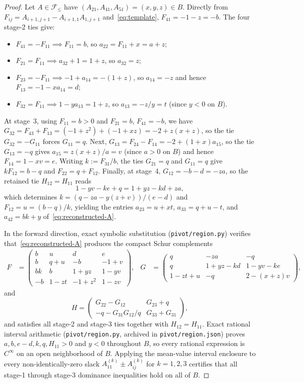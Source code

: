 \documentclass[11pt]{article}
\theoremstyle{remark}
\begin{document}
\begin{proof}
Let $A\in\mathcal{F}_{\le}$ have $(A_{21},A_{41},A_{51})=(x,y,z)\in B$.
Directly from $F_{ij}=A_{i+1,j+1}-A_{i+1,1}A_{1,j+1}$ and~\eqref{eq:template},
$F_{41}=-1-z=-b$. The four stage-2 ties give:
\begin{itemize}
  \item $F_{41}=-F_{11} \implies F_{11}=b$, so $a_{22}=F_{11}+x=a+z$;
  \item $F_{21}=F_{11} \implies a_{32}+1=1+z$, so $a_{32}=z$;
  \item $F_{23}=-F_{11} \implies -1+a_{14}=-(1+z)$, so $a_{14}=-z$ and
  hence $F_{13}=-1-xa_{14}=d$;
  \item $F_{32}=F_{11} \implies 1-ya_{13}=1+z$, so $a_{13}=-z/y=t$ (since $y<0$ on $B$).
\end{itemize}
At stage~3, using $F_{11}=b>0$ and $F_{21}=b$, $F_{41}=-b$, we have
$G_{32}=F_{43}+F_{13}=(-1+z^2)+(-1+xz)=-2+z(x+z)$, so the tie
$G_{32}=-G_{11}$ forces $G_{11}=q$. Next,
$G_{13}=F_{24}-F_{14}=-2+(1+x)a_{15}$, so the tie $G_{13}=-q$ gives
$a_{15}=z(x+z)/a=v$ (since $a>0$ on $B$) and hence $F_{14}=1-xv=e$.
Writing $k:=F_{31}/b$, the ties $G_{21}=q$ and $G_{11}=q$ give
$kF_{12}=b-q$ and $F_{22}=q+F_{12}$. Finally, at stage~4,
$G_{12}=-b-d=-za$, so the retained tie $H_{12}=H_{11}$ reads
\[
  1 - yv - ke + q = 1 + yz - kd + za,
\]
which determines $k=(q-za-y(z+v))/(e-d)$ and $F_{12}=u=(b-q)/k$, yielding the
entries $a_{23}=u+xt$, $a_{33}=q+u-t$, and $a_{42}=bk+y$ of~\eqref{eq:reconstructed-A}.

In the forward direction, exact symbolic substitution (\texttt{pivot/region.py})
verifies that~\eqref{eq:reconstructed-A} produces the compact Schur
complements
\begin{align*}
F &= \begin{pmatrix}
  b & u & d & e \\
  b & q+u & -b & -1+v \\
  bk & b & 1+yz & 1-yv \\
  -b & 1-zt & -1+z^2 & 1-zv
\end{pmatrix}, &
G &= \begin{pmatrix}
  q & -za & -q \\
  q & 1+yz-kd & 1-yv-ke \\
  1-zt+u & -q & 2-(x+z)v
\end{pmatrix},
\end{align*}
and
\[
H = \begin{pmatrix}
  G_{22}-G_{12} & G_{23}+q \\
  -q - G_{31}G_{12}/q & G_{33}+G_{31}
\end{pmatrix},
\]
and satisfies all stage-2 and stage-3 ties together with $H_{12}=H_{11}$.
Exact rational interval arithmetic (\texttt{pivot/region.py}, archived in
\texttt{pivot/region.json}) proves $a,b,e-d,k,q,H_{11}>0$ and $y<0$ throughout
$B$, so every rational expression is $C^\infty$ on an open neighborhood of $B$.
Applying the mean-value interval enclosure to every non-identically-zero slack
$A^{(k)}_{11}\pm A^{(k)}_{ij}$ for $k=1,2,3$ certifies that all stage-1
through stage-3 dominance inequalities hold on all of $B$.
\end{proof}
\end{document}
